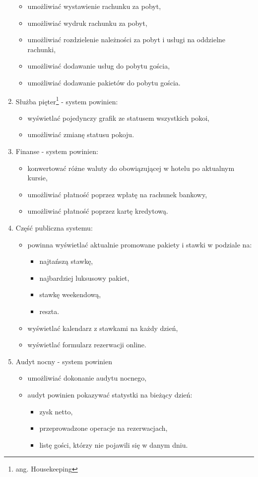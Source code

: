 \documentclass[a4paper,onecolumn,oneside,11pt,wide,floatssmall]{mwrep}
\theoremstyle{definition}
\theoremstyle{plain}%
\theoremstyle{remark}
\begin{document}
\begin{enumerate}
\begin{itemize}
      \item umożliwiać wystawienie rachunku za pobyt,
      \item umożliwiać wydruk rachunku za pobyt,
      \item umożliwiać rozdzielenie należności za pobyt i usługi na oddzielne rachunki,
      \item umożliwiać dodawanie usług do pobytu gościa,
      \item umożliwiać dodawanie pakietów do pobytu gościa.
    \end{itemize}
  \item Służba pięter\footnote{ang. Housekeeping} - system powinien:
    \begin{itemize}
      \item wyświetlać pojedynczy grafik ze statusem wszystkich pokoi,
      \item umożliwiać zmianę statusu pokoju.
    \end{itemize}
  \item Finanse - system powinien:
    \begin{itemize}
      \item konwertować różne waluty do obowiązującej w hotelu po aktualnym kursie,
      \item umożliwiać płatność poprzez wpłatę na rachunek bankowy,
      \item umożliwiać płatność poprzez kartę kredytową.
    \end{itemize}
  \item Część publiczna systemu:
    \begin{itemize}
      \item powinna wyświetlać aktualnie promowane pakiety i stawki w podziale na:
        \begin{itemize}
          \item najtańszą stawkę,
          \item najbardziej luksusowy pakiet,
          \item stawkę weekendową,
          \item reszta.
        \end{itemize}
      \item wyświetlać kalendarz z stawkami na każdy dzień,
      \item wyświetlać formularz rezerwacji online.
    \end{itemize}
  \item Audyt nocny - system powinien
    \begin{itemize}
      \item umożliwiać dokonanie audytu nocnego,
      \item audyt powinien pokazywać statystki na bieżący dzień:
        \begin{itemize}
          \item zysk netto,
          \item przeprowadzone operacje na rezerwacjach,
          \item listę gości, którzy nie pojawili się w danym dniu.
        \end{itemize}
    \end{itemize}
\end{enumerate}
\end{document}
